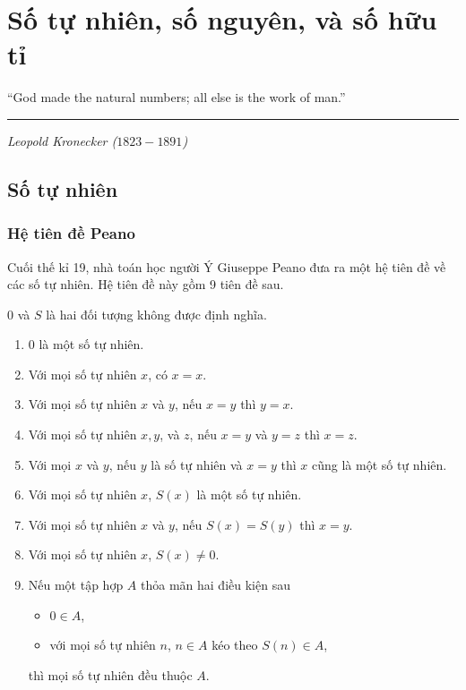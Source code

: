 \chapter{Số tự nhiên, số nguyên, và số hữu tỉ}\label{chapter:natural-numbers-integers-and-rationals}

\noindent ``God made the natural numbers; all else is the work of man.\@''

\noindent \rule[0.5ex]{2cm}{0.5pt}

\noindent \textit{Leopold Kronecker ($1823-1891$)}

\section{Số tự nhiên}

\subsection{Hệ tiên đề Peano}

Cuối thế kỉ 19, nhà toán học người Ý Giuseppe Peano đưa ra một hệ tiên đề về các số tự nhiên. Hệ tiên đề này gồm 9 tiên đề sau.

\begin{axiom}
    $0$ và $S$ là hai đối tượng không được định nghĩa.

    \begin{enumerate}[label={(PA\arabic*)},itemsep=0pt,topsep=0pt,itemindent=0.25cm]
        \item $0$ là một số tự nhiên.
        \item Với mọi số tự nhiên $x$, có $x = x$.
        \item Với mọi số tự nhiên $x$ và $y$, nếu $x = y$ thì $y = x$.
        \item Với mọi số tự nhiên $x, y$, và $z$, nếu $x = y$ và $y = z$ thì $x = z$.
        \item Với mọi $x$ và $y$, nếu $y$ là số tự nhiên và $x = y$ thì $x$ cũng là một số tự nhiên.
        \item Với mọi số tự nhiên $x$, $S(x)$ là một số tự nhiên.
        \item Với mọi số tự nhiên $x$ và $y$, nếu $S(x) = S(y)$ thì $x = y$.
        \item Với mọi số tự nhiên $x$, $S(x) \ne 0$.
        \item Nếu một tập hợp $A$ thỏa mãn hai điều kiện sau
              \begin{itemize}[itemsep=0pt,topsep=0pt]
                  \item $0\in A$,
                  \item với mọi số tự nhiên $n$, $n\in A$ kéo theo $S(n)\in A$,
              \end{itemize}
              thì mọi số tự nhiên đều thuộc $A$.
    \end{enumerate}
\end{axiom}

